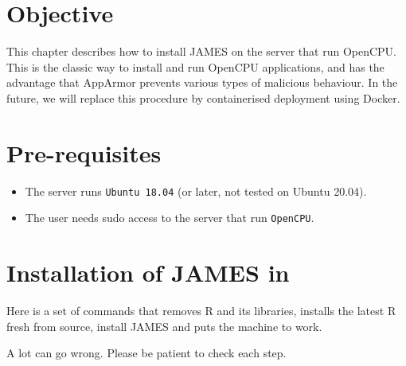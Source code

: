 \documentclass[
]{book}
\providecommand{\tightlist}{%
  \setlength{\itemsep}{0pt}\setlength{\parskip}{0pt}}
\begin{document}
\hypertarget{objective-1}{%
\section{Objective}\label{objective-1}}

This chapter describes how to install JAMES on the server that run OpenCPU. This is the classic way to install and run OpenCPU applications, and has the advantage that AppArmor prevents various types of malicious behaviour. In the future, we will replace this procedure by containerised deployment using Docker.

\hypertarget{pre-requisites}{%
\section{Pre-requisites}\label{pre-requisites}}

\begin{itemize}
\tightlist
\item
  The server runs \texttt{Ubuntu\ 18.04} (or later, not tested on Ubuntu 20.04).
\item
  The user needs sudo access to the server that run \texttt{OpenCPU}.
\end{itemize}

\hypertarget{installation-of-james-in}{%
\section{Installation of JAMES in}\label{installation-of-james-in}}

Here is a set of commands that removes R and its libraries, installs the latest
R fresh from source, install JAMES and puts the machine to work.

A lot can go wrong. Please be patient to check each step.
\end{document}
